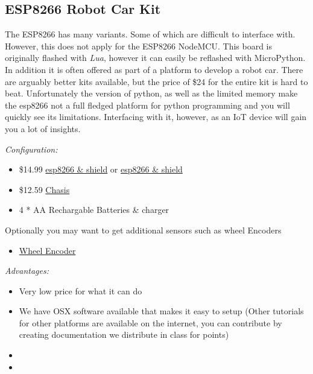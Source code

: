 \subsection{ESP8266 Robot Car Kit}\label{esp8266-robot-car-kit}

The ESP8266 has many variants. Some of which are difficult to interface
with. However, this does not apply for the ESP8266 NodeMCU. This board
is originally flashed with \emph{Lua}, however it can easily be
reflashed with MicroPython. In addition it is often offered as part of a
platform to develop a robot car. There are arguably better kits
available, but the price of \$24 for the entire kit is hard to beat.
Unfortunately the version of python, as well as the limited memory make
the esp8266 not a full fledged platform for python programming and you
will quickly see its limitations. Interfacing with it, however, as an
IoT device will gain you a lot of insights.

\emph{Configuration:}

\begin{itemize}
\tightlist
\item
  \$14.99
  \href{https://www.amazon.com/KOOKYE-ESP8266-NodeMcu-ESP-12E-Expansion/dp/B01C6MR62E/ref=sr_1_1?ie=UTF8\&qid=1499251895\&sr=8-1\&keywords=esp8266+robot+car}{esp8266
  \& shield} or
  \href{https://www.amazon.com/Makerfocus-ESP8266-ESP-12E-Development-Expansion/dp/B01MU4XQUN/ref=sr_1_2?ie=UTF8\&qid=1499252002\&sr=8-2\&keywords=esp8266+motor+shield}{esp8266
  \& shield}
\item
  \$12.59
  \href{https://www.amazon.com/Emgreat-Chassis-Encoder-wheels-Battery/dp/B00GLO5SMY/ref=pd_rhf_se_s_cp_10?_encoding=UTF8\&pd_rd_i=B00GLO5SMY\&pd_rd_r=77XYGK6BE54FGDTGQ0AC\&pd_rd_w=FNQFl\&pd_rd_wg=wKMdb\&psc=1\&refRID=77XYGK6BE54FGDTGQ0AC}{Chasis}
\item
  4 * AA Rechargable Batteries \& charger
\end{itemize}

Optionally you may want to get additional sensors such as wheel Encoders

\begin{itemize}
\tightlist
\item
  \href{https://www.amazon.com/Wheel-Encoder-Kit-Robot-Car/dp/B00NPWGEIM/ref=sr_1_4?s=toys-and-games\&ie=UTF8\&qid=1499254488\&sr=1-4\&keywords=speed+sensor+robot+car+wheel}{Wheel
  Encoder}
\end{itemize}

\emph{Advantages:}

\begin{itemize}
\item
  Very low price for what it can do
\item
  We have OSX software available that makes it easy to setup (Other
  tutorials for other platforms are available on the internet, you can
  contribute by creating documentation we distribute in class for
  points)
\item
\item
\end{itemize}


